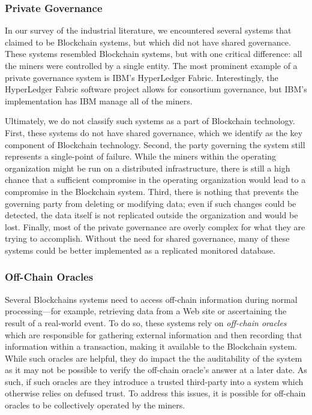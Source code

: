 \subsubsection{Private Governance}
In our survey of the industrial literature, we encountered several systems that claimed to be Blockchain systems, but which did not have shared governance.
These systems resembled Blockchain systems, but with one critical difference: all the miners were controlled by a single entity.
The most prominent example of a private governance system is IBM's HyperLedger Fabric.
Interestingly, the HyperLedger Fabric software project allows for consortium governance, but IBM's implementation has IBM manage all of the miners.

Ultimately, we do not classify such systems as a part of Blockchain technology.
First, these systems do not have shared governance, which we identify as the key component of Blockchain technology.
Second, the party governing the system still represents a single-point of failure.
While the miners within the operating organization might be run on a distributed infrastructure, there is still a high chance that a sufficient compromise in the operating organization would lead to a compromise in the Blockchain system.
Third, there is nothing that prevents the governing party from deleting or modifying data; even if such changes could be detected, the data itself is not replicated outside the organization and would be lost.
Finally, most of the private governance are overly complex for what they are trying to accomplish.
Without the need for shared governance, many of these systems could be better implemented as a replicated monitored database.

\subsubsection{Off-Chain Oracles}
Several Blockchains systems need to access off-chain information during normal processing---for example, retrieving data from a Web site or ascertaining the result of a real-world event.
To do so, these systems rely on \emph{off-chain oracles} which are responsible for gathering external information and then recording that information within a transaction, making it available to the Blockchain system.
While such oracles are helpful, they do impact the the auditability of the system as it may not be possible to verify the off-chain oracle's answer at a later date.
As such, if such oracles are they introduce a trusted third-party into a system which otherwise relies on defused trust.
To address this issues, it is possible for off-chain oracles to be collectively operated by the miners.

